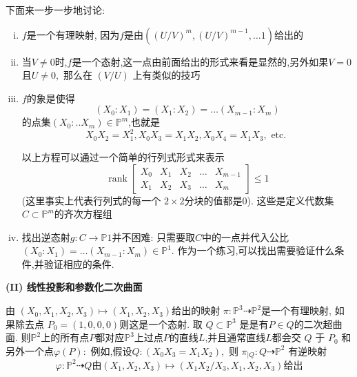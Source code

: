 \documentclass[UTF8]{book}
\begin{document}
		
		下面来一步一步地讨论:
		\begin{enumerate}[(i)]
			\item $ f $是一个有理映射, 因为$ f $是由$\left((U / V)^{m},(U / V)^{m-1}, \ldots 1\right)$给出的
			
			\item  当$V \neq 0$时,$ f $是一个态射,这一点由前面给出的形式来看是显然的,另外如果$V =0$且$U \neq 0,$ 那么在 $( V / U )$ 上有类似的技巧
			
			\item $ f $的象是使得
			\begin{equation*}
			\left( X _{0}: X _{1}\right)=\left( X _{1}: X _{2}\right)=\dots \left( X _{ m -1}: X _{ m }\right)
			\end{equation*}
			的点集$\left(X_{0}: . . X_{m}\right) \in \mathbb{P} ^{m}$,也就是
			\begin{equation*}
			X_{0} X_{2}=X_{1}^{2}, X_{0} X_{3}=X_{1} X_{2}, X_{0} X_{4}=X_{1} X_{3}, \text { etc. }
			\end{equation*}

		
			以上方程可以通过一个简单的行列式形式来表示
			\begin{equation*}
			\operatorname{rank}\left[\begin{array}{lllll} 
			X _{0} & X _{1} & X _{2} & \ldots & X _{ m -1} \\
			X _{1} & X _{2} & X _{3} & \ldots & X _{ m }
			\end{array}\right] \leq 1
			\end{equation*}
			(这里事实上代表行列式的每一个 $2 \times 2$分块的值都是0). 这些是定义代数集$C \subset \mathbb{P} ^{ m }$的齐次方程组
			
			\item 找出逆态射$g : C \rightarrow \mathbb{P} 1$并不困难: 只需要取$C$中的一点并代入公比$\left( X _{0}: X _{1}\right)=\ldots\left( X _{ m -1}: X _{ m }\right) \in \mathbb{P} ^{1} .$ 作为一个练习,可以找出需要验证什么条件,并验证相应的条件.
		\end{enumerate}
	
	
		\textbf{(II) 线性投影和参数化二次曲面} 
		
		
		 由 $\left( X _{0}, X _{1}, X _{2}, X _{3}\right) \mapsto\left( X _{1}, X _{2}, X _{3}\right)$给出的映射 $\pi: \mathbb{P} ^{3} \dashrightarrow \mathbb{P} ^{2}$是一个有理映射, 如果除去点 $P_{0}=(1,0,0,0)$则这是一个态射. 取 $Q \subset \mathbb{P} ^{3}$ 是是有$ P \in Q $的二次超曲面. 则$\mathbb{P} ^{2}$上的所有点$ P $都对应$\mathbb{P} ^{3}$上过点$ P $的直线$ L $,并且通常直线$ L $都会交 $Q$ 于 $P_{0}$ 和另外一个点$\varphi(P):$ 例如,假设$Q :\left( X _{0} X _{3}= X _{1} X _{2}\right),$ 则 $\pi_{| Q }: Q \dashrightarrow \mathbb{P} ^{2}$ 有逆映射
		\begin{equation*}
		\varphi: \mathbb{P} ^{2} \dashrightarrow Q \text{由} \left( X _{1}, X _{2}, X _{3}\right) \mapsto\left( X _{1} X _{2} / X _{3}, X _{1}, X _{2}, X _{3}\right) \text{给出}
		\end{equation*}
		
\end{document}
